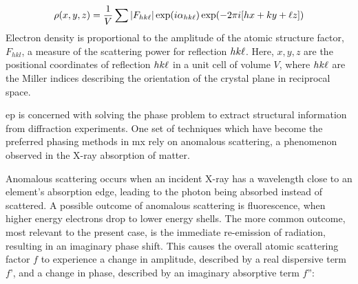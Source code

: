 


\begin{equation}
    \rho(x,y,z)=\frac{1}{V} \sum |F_{hk\ell}| \exp(i\alpha_{hk\ell}) \exp(-2\pi i [hx+ky+\ell z]) \label{electron_density}
\end{equation}
Electron density is proportional to the amplitude of the atomic structure factor, $F_{hkl}$, a measure of the scattering power for reflection $hk\ell$. Here, $x,y,z$ are the positional coordinates of reflection $hk\ell$ in a unit cell of volume $V$, where $hk\ell$ are the Miller indices describing the orientation of the crystal plane in reciprocal space. %

\ac{ep} is concerned with solving the phase problem to extract structural information from diffraction experiments. One set of techniques which have become the preferred phasing methods in \ac{mx} rely on anomalous scattering, a phenomenon observed in the X-ray absorption of matter.

Anomalous scattering occurs when an incident X-ray has a wavelength close to an element’s absorption edge, leading to the photon being absorbed instead of scattered. A possible outcome of anomalous scattering is fluorescence, when higher energy electrons drop to lower energy shells. The more common outcome, most relevant to the present case, is the immediate re-emission of radiation, resulting in an imaginary phase shift. This causes the overall atomic scattering factor $f$ to experience a change in amplitude, described by a real dispersive term $f’$, and a change in phase, described by an imaginary absorptive term $f”$:


